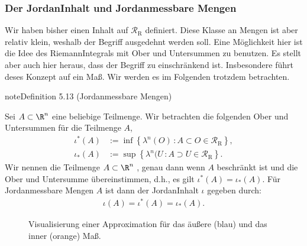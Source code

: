 \documentclass[letterpaper,10pt,german]{jupyterBook}
\let\sphinxpxdimen\pdfpxdimen\else\newdimen\sphinxpxdimen
\begin{document}
\subsubsection{Der Jordan\sphinxhyphen{}Inhalt und Jordan\sphinxhyphen{}messbare Mengen}
\label{\detokenize{masstheorie/masstheorie:der-jordan-inhalt-und-jordan-messbare-mengen}}
\sphinxAtStartPar
Wir haben bisher einen Inhalt auf \(\mathcal{R}_{\text{R}}\) definiert. Diese Klasse an Mengen ist aber relativ klein, weshalb der Begriff ausgedehnt werden soll. Eine Möglichkeit hier ist die Idee des Riemann\sphinxhyphen{}Integrals mit Ober\sphinxhyphen{} und Untersummen zu benutzen. Es stellt aber auch hier heraus, dass der Begriff zu einschränkend ist. Insbesondere führt deses Konzept  auf ein Maß. Wir werden es im Folgenden trotzdem betrachten.
\label{masstheorie/masstheorie:definition-23}
\begin{sphinxadmonition}{note}{Definition 5.13 (Jordan\sphinxhyphen{}messbare Mengen)}



\sphinxAtStartPar
Sei \(A \subset \R^n\) eine beliebige Teilmenge.
Wir betrachten die folgenden  Ober\sphinxhyphen{} und Untersummen für die Teilmenge \(A\),
\begin{equation*}
\begin{split}\iota^\ast(A) &:= \inf \left\{ \lambda^n(O) \, : A \subset O \in\mathcal{R}_{\text{R}}\right\},\\
\iota_\ast(A) &:= \sup \left\{ \lambda^n(U \, : A \supset U\in\mathcal{R}_{\text{R}} \right\}.\end{split}
\end{equation*}
\sphinxAtStartPar
Wir nennen die Teilmenge \(A \subset \R^n\) , genau dann wenn \(A\) beschränkt ist und die Ober\sphinxhyphen{} und Untersumme übereinstimmen, d.h., es gilt \(\iota^\ast(A) = \iota_\ast(A)\).
Für Jordan\sphinxhyphen{}messbare Mengen \(A\) ist dann der Jordan\sphinxhyphen{}Inhalt \(\iota\) gegeben durch:
\begin{equation*}
\begin{split}\iota(A) = \iota^\ast(A) = \iota_\ast(A).\end{split}
\end{equation*}\end{sphinxadmonition}

\begin{figure}[htbp]
\centering
\capstart

\noindent\sphinxincludegraphics[width=400\sphinxpxdimen]{{jordanmeasure}.jpg}
\caption{Visualisierung einer Approximation für das äußere (blau) und das inner (orange) Maß.}\label{\detokenize{masstheorie/masstheorie:fig-jordanmeasure}}\end{figure}
\end{document}
